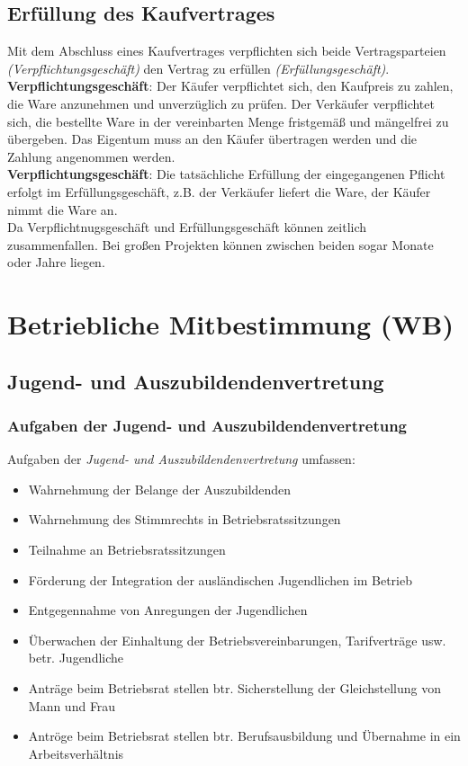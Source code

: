 \documentclass[a4paper, 12pt]{report}
\begin{document}
\subsection{Erfüllung des Kaufvertrages}

Mit dem Abschluss eines Kaufvertrages verpflichten sich beide Vertragsparteien
\emph{(Verpflichtungsgeschäft)} den Vertrag zu erfüllen 
\emph{(Erfüllungsgeschäft)}. \\

\textbf{Verpflichtungsgeschäft}: Der Käufer verpflichtet sich, den Kaufpreis zu 
zahlen, die Ware anzunehmen und unverzüglich zu prüfen. Der Verkäufer 
verpflichtet sich, die bestellte Ware in der vereinbarten Menge fristgemäß und 
mängelfrei zu übergeben. Das Eigentum muss an den Käufer übertragen werden und 
die Zahlung angenommen werden. \\

\textbf{Verpflichtungsgeschäft}: Die tatsächliche Erfüllung der eingegangenen
Pflicht erfolgt im Erfüllungsgeschäft, z.B. der Verkäufer liefert die Ware, 
der Käufer nimmt die Ware an. \\

Da Verpflichtnugsgeschäft und Erfüllungsgeschäft können zeitlich zusammenfallen. 
Bei großen Projekten können zwischen beiden sogar Monate oder Jahre liegen. 

\section{Betriebliche Mitbestimmung (WB)}

\subsection{Jugend- und Auszubildendenvertretung}

\subsubsection{Aufgaben der Jugend- und Auszubildendenvertretung}

Aufgaben der \emph{Jugend- und Auszubildendenvertretung} umfassen: 

\begin{itemize}
    \item Wahrnehmung der Belange der Auszubildenden 
    \item Wahrnehmung des Stimmrechts in Betriebsratssitzungen
    \item Teilnahme an Betriebsratssitzungen
    \item Förderung der Integration der ausländischen Jugendlichen im Betrieb
    \item Entgegennahme von Anregungen der Jugendlichen
    \item Überwachen der Einhaltung der Betriebsvereinbarungen, Tarifverträge
        usw. betr. Jugendliche
    \item Anträge beim Betriebsrat stellen btr. Sicherstellung der 
        Gleichstellung von Mann und Frau
    \item Antröge beim Betriebsrat stellen btr. Berufsausbildung und Übernahme 
        in ein Arbeitsverhältnis
\end{itemize}
\end{document}
